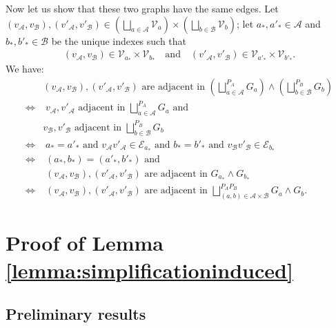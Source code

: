 \documentclass[conference,a4paper]{IEEEtran}
\begin{document}
    Now let us show that these two graphs have the same edges. Let $(v_{\mathcal{A}},v_{\mathcal{B}}),(v'_{\mathcal{A}},v'_{\mathcal{B}}) \in \left(\bigsqcup_{a \in \mathcal{A}} \mathcal{V}_a\right) \times \left(\bigsqcup_{b \in \mathcal{B}} \mathcal{V}_b\right)$; let $a_*, a'_* \in \mathcal{A}$ and $b_*,b'_* \in \mathcal{B}$ be the unique indexes such that
    \begin{align}
        (v_{\mathcal{A}},v_{\mathcal{B}}) \in \mathcal{V}_{a_*} \times \mathcal{V}_{b_*} \quad \text{and} \quad (v'_{\mathcal{A}},v'_{\mathcal{B}}) \in \mathcal{V}_{a'_*} \times \mathcal{V}_{b'_*}.
    \end{align}
    We have:
    \begin{align}
        &  \!\!\! (v_{\mathcal{A}},v_{\mathcal{B}}),(v'_{\mathcal{A}},v'_{\mathcal{B}}) \text{ are adjacent in } \left(\bigsqcup_{a \in \mathcal{A}}^{P_A} G_a\right) \wedge \left(\bigsqcup_{b \in \mathcal{B}}^{P_B} G_b\right)\\
        \Longleftrightarrow & \; v_{\mathcal{A}}, v'_{\mathcal{A}} \text{ adjacent in } \bigsqcup_{a \in \mathcal{A}}^{P_A} G_a \text{ and } \nonumber\\
        & v_{\mathcal{B}}, v'_{\mathcal{B}} \text{ adjacent in } \bigsqcup_{b \in \mathcal{B}}^{P_B} G_b\\
        \Longleftrightarrow & \; a_* = a'_* \text{ and } v_{\mathcal{A}} v'_{\mathcal{A}} \in \mathcal{E}_{a_*} \text{ and } b_* = b'_* \text{ and } v_{\mathcal{B}} v'_{\mathcal{B}} \in \mathcal{E}_{b_*} \\
        \Longleftrightarrow & \; (a_*,b_*) = (a'_*, b'_*) \text{ and } \nonumber\\ 
        & \; (v_{\mathcal{A}},v_{\mathcal{B}}),(v'_{\mathcal{A}},v'_{\mathcal{B}}) \text{ are adjacent in } G_{a_*} \wedge G_{b_*} \\
        \Longleftrightarrow & \; (v_{\mathcal{A}},v_{\mathcal{B}}),(v'_{\mathcal{A}},v'_{\mathcal{B}}) \text{ are adjacent in } \bigsqcup_{(a,b) \in \mathcal{A} \times \mathcal{B}}^{P_AP_B} G_a \wedge G_b.
    \end{align}


\section{Proof of Lemma \ref{lemma:simplificationinduced}} \label{section:prooflemmasimplificationinduced}

\subsection{Preliminary results}
\end{document}

